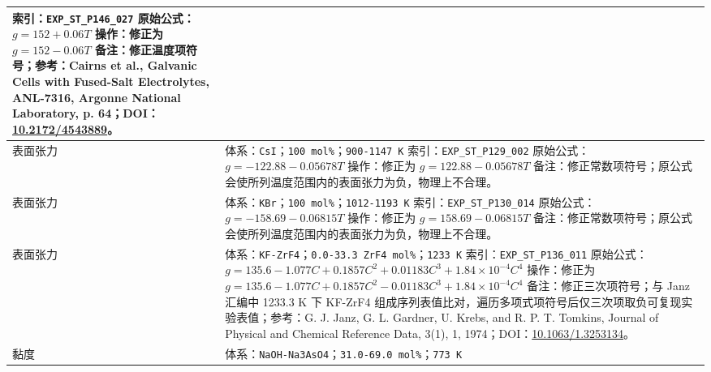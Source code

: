 \documentclass[12pt]{article}
\providecommand{\passthrough}[1]{#1}
\begin{document}
{\begin{longtable}[]{@{}
  >{\raggedright\arraybackslash}p{}
  >{\raggedright\arraybackslash}p{}@{}}
索引：\passthrough{\lstinline!EXP_ST_P146_027!}\newline
原始公式：\(g = 152 + 0.06 T\)\newline
操作：修正为 \(g = 152 - 0.06 T\)\newline
备注：修正温度项符号；参考：Cairns et al., Galvanic Cells with Fused-Salt Electrolytes, ANL-7316, Argonne National Laboratory, p. 64；DOI：\href{https://doi.org/10.2172/4543889}{10.2172/4543889}。 \\
\midrule
表面张力 & 体系：\passthrough{\lstinline!CsI!}；\texttt{100 mol\%}；\passthrough{\lstinline!900-1147 K!}\newline
索引：\passthrough{\lstinline!EXP_ST_P129_002!}\newline
原始公式：\(g = -122.88 - 0.05678 T\)\newline
操作：修正为 \(g = 122.88 - 0.05678 T\)\newline
备注：修正常数项符号；原公式会使所列温度范围内的表面张力为负，物理上不合理。 \\
\midrule
表面张力 & 体系：\passthrough{\lstinline!KBr!}；\texttt{100 mol\%}；\passthrough{\lstinline!1012-1193 K!}\newline
索引：\passthrough{\lstinline!EXP_ST_P130_014!}\newline
原始公式：\(g = -158.69 - 0.06815 T\)\newline
操作：修正为 \(g = 158.69 - 0.06815 T\)\newline
备注：修正常数项符号；原公式会使所列温度范围内的表面张力为负，物理上不合理。 \\
\midrule
表面张力 & 体系：\passthrough{\lstinline!KF-ZrF4!}；\texttt{0.0-33.3 ZrF4 mol\%}；\passthrough{\lstinline!1233 K!}\newline
索引：\passthrough{\lstinline!EXP_ST_P136_011!}\newline
原始公式：\(g = 135.6 - 1.077 C + 0.1857 C^2 + 0.01183 C^3 + 1.84 \times 10^{-4} C^4\)\newline
操作：修正为 \(g = 135.6 - 1.077 C + 0.1857 C^2 - 0.01183 C^3 + 1.84 \times 10^{-4} C^4\)\newline
备注：修正三次项符号；与 Janz 汇编中 1233.3 K 下 KF-ZrF4 组成序列表值比对，遍历多项式项符号后仅三次项取负可复现实验表值；参考：G. J. Janz, G. L. Gardner, U. Krebs, and R. P. T. Tomkins, Journal of Physical and Chemical Reference Data, 3(1), 1, 1974；DOI：\href{https://doi.org/10.1063/1.3253134}{10.1063/1.3253134}。 \\
\midrule
黏度 & 体系：\passthrough{\lstinline!NaOH-Na3AsO4!}；\texttt{31.0-69.0 mol\%}；\passthrough{\lstinline!773 K!}\newline

\end{longtable}}
\end{document}
